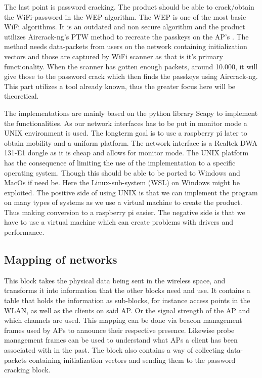 The last point is password cracking. The product should be able to crack/obtain the WiFi-password in the WEP algorithm. The WEP is one of the most basic WiFi algorithms. It is an outdated and non secure algorithm and the product utilizes  Aircrack-ng's PTW method to recreate the passkeys on the AP's \cite{aircrack-ng}. The method needs data-packets from users on the network containing initialization vectors and those are captured by WiFi scanner as that is it's primary functionality. When the scanner has gotten enough packets, around 10.000, it will give those to the password crack which then finds the passkeys using Aircrack-ng. This part utilizes a tool already known, thus the greater focus here will be theoretical.

The implementations are mainly based on the python library Scapy\cite{scapy} to implement the functionalities. As our network interfaces has to be put in monitor mode a UNIX environment is used. The longterm goal is to use a raspberry pi later to obtain mobility and a uniform platform. 
The network interface is a Realtek DWA 131-E1 dongle as it is cheap and allows for monitor mode. The UNIX platform has the consequence of limiting the use of the implementation to a specific operating system. Though this should be able to be ported to Windows and MacOs if need be. Here the Linux-sub-system (WSL) on Windows might be exploited.
The positive side of using UNIX is that we can implement the program on many types of systems as we use a virtual machine to create the product. Thus making conversion to a raspberry pi easier. The negative side is that we have to use a virtual machine which can create problems with drivers and performance. 

\subsection{Mapping of networks}
This block takes the physical data being sent in the wireless space, and transforms it into information that the other blocks need and use. It contains a table that holds the information as sub-blocks, for instance access points in the WLAN, as well as the clients on said AP. Or the signal strength of the AP and which channels are used. This mapping can be done via beacon management frames used by APs to announce their respective presence. Likewise probe management frames can be used to understand what APs a client has been associated with in the past.
The block also contains a way of collecting data-packets containing initialization vectors and sending them to the password cracking block. 

